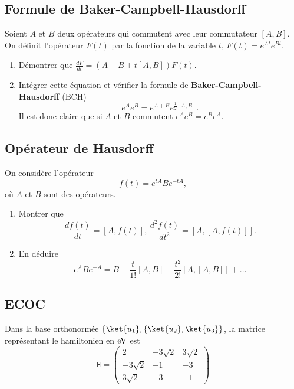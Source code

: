 \subsection{Formule de Baker-Campbell-Hausdorff}

\label{sec:BCH1} Soient $A$ et $B$ deux opérateurs qui commutent avec leur
commutateur $[A,B]$. On définit l'opérateur $F(t)$ par la fonction de la
variable $t$, $F(t)=e^{At}e^{Bt}$.

\begin{enumerate}
\item Démontrer que $\frac{dF}{dt}=(A+B+t[A,B])F(t)$.

\item Intégrer cette équation et vérifier la formule de
\textbf{Baker-Campbell-Hausdorff}  (BCH)
\begin{equation}
e^{A}e^{B}=e^{A+B}e^{\frac{1}{2}[A,B]}.
\end{equation}
Il est donc claire que si $A$ et $B$ commutent $e^{A}e^{B}=e^{B}e^{A}$.
\end{enumerate}

\subsection{Opérateur de Hausdorff}

\label{sec:IdOp1} On considère l'opérateur
\begin{equation}
f(t)=e^{tA}Be^{-tA},
\end{equation}
où $A$ et $B$ sont des opérateurs.

\begin{enumerate}
\item Montrer que%
\begin{equation}
\frac{df(t)}{dt}=[A,f(t)],\,\frac{d^2f(t)}{dt^2}=[A,[A,f(t)]].
\end{equation}

\item En déduire
\begin{equation}
e^{A}Be^{-A}=B+\frac{t}{1!}[A,B]+\frac{t^{2}}{2!}[A,[A,B]]+\ldots
\end{equation}

\end{enumerate}

\subsection{ECOC}
\label{sec:ExoECOC}
Dans la base orthonormée $\{\ket{u_1},\{\ket{u_2},\ket{u_3}\}$, la matrice
représentant le hamiltonien en $\operatorname{eV}$ est%
\begin{equation}
\mathtt{H}=\begin{pmatrix}
2 & -3\sqrt{2} & 3\sqrt{2}\\
-3\sqrt{2} & -1 & -3\\
3\sqrt{2} & -3 & -1
\end{pmatrix}
\end{equation}

